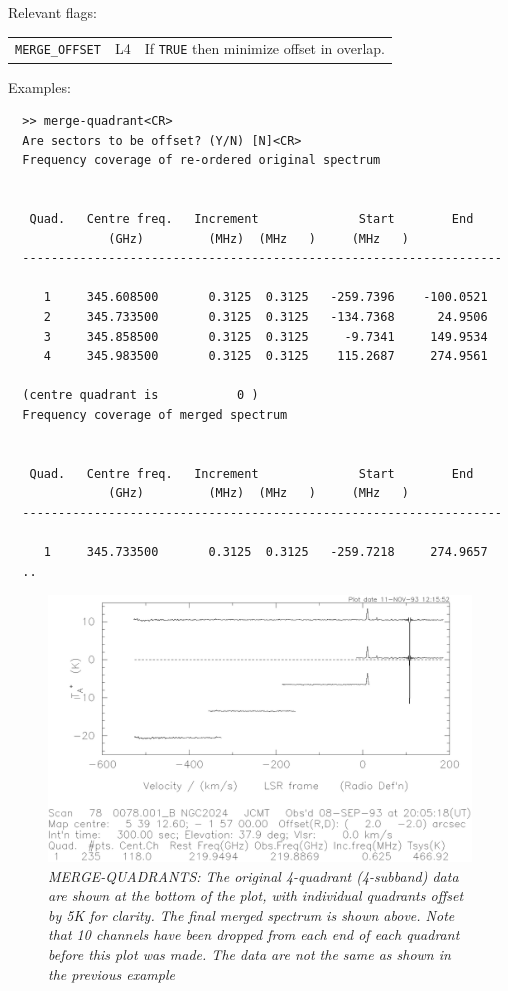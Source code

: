 \documentclass[11pt,twoside]{report}
\begin{document}
Relevant flags:\\
\begin{tabular}{lll}
  \verb+MERGE_OFFSET+ & L4 & If \verb+TRUE+ then minimize offset in overlap.
\end{tabular}

Examples:
\begin{verbatim}
  >> merge-quadrant<CR>
  Are sectors to be offset? (Y/N) [N]<CR>
  Frequency coverage of re-ordered original spectrum


   Quad.   Centre freq.   Increment              Start        End
              (GHz)         (MHz)  (MHz   )     (MHz   )
  -------------------------------------------------------------------

     1     345.608500       0.3125  0.3125   -259.7396    -100.0521
     2     345.733500       0.3125  0.3125   -134.7368      24.9506
     3     345.858500       0.3125  0.3125     -9.7341     149.9534
     4     345.983500       0.3125  0.3125    115.2687     274.9561

  (centre quadrant is           0 )
  Frequency coverage of merged spectrum


   Quad.   Centre freq.   Increment              Start        End
              (GHz)         (MHz)  (MHz   )     (MHz   )
  -------------------------------------------------------------------

     1     345.733500       0.3125  0.3125   -259.7218     274.9657
  ..
\end{verbatim}

\begin{figure}[htbp]
\begin{center}
\includegraphics[scale=0.65]{merge.ps}
\protect\parbox{5.5in}
{\caption[MERGE]
{\sl
MERGE-QUADRANTS: The original 4-quadrant (4-subband) data are shown at the
bottom of the plot, with individual quadrants offset by 5K for clarity. The
final merged spectrum is shown above. Note that 10 channels have been dropped
from each end of each quadrant before this plot was made. The data are {\em
not} the same as shown in the previous example
\label{MERGE}
}
}
\end{center}
\end{figure}
\end{document}
